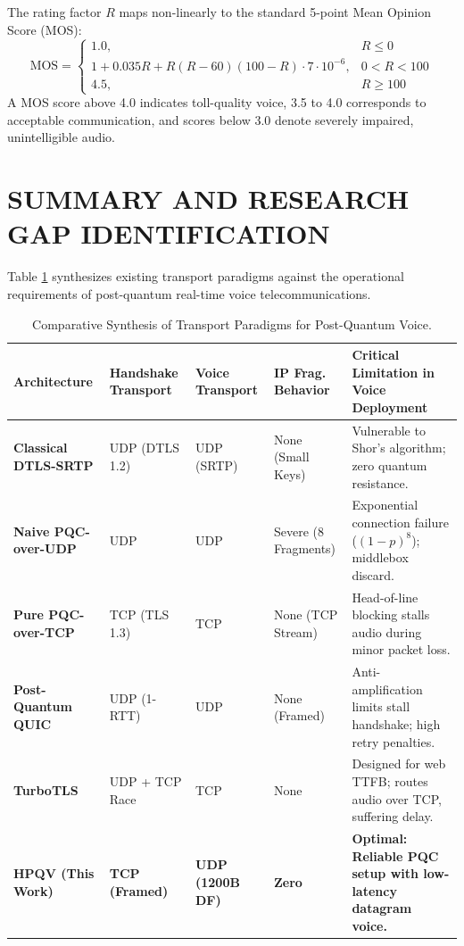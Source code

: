 The rating factor $R$ maps non-linearly to the standard 5-point Mean Opinion Score (MOS):
\begin{equation}
    \text{MOS} = 
    \begin{cases} 
      1.0, & R \le 0 \\
      1 + 0.035 R + R(R - 60)(100 - R) \cdot 7 \cdot 10^{-6}, & 0 < R < 100 \\
      4.5, & R \ge 100 
   \end{cases}
\end{equation}
A MOS score above 4.0 indicates toll-quality voice, 3.5 to 4.0 corresponds to acceptable communication, and scores below 3.0 denote severely impaired, unintelligible audio.

\section{SUMMARY AND RESEARCH GAP IDENTIFICATION}
Table \ref{tab:literature_comparison} synthesizes existing transport paradigms against the operational requirements of post-quantum real-time voice telecommunications.

\begin{table}[htbp]
    \centering
    \caption{Comparative Synthesis of Transport Paradigms for Post-Quantum Voice.}
    \label{tab:literature_comparison}
    \small
    \begin{tabularx}{\textwidth}{>{\raggedright\arraybackslash}p{2.6cm} >{\raggedright\arraybackslash}p{2.2cm} >{\raggedright\arraybackslash}p{2.2cm} >{\raggedright\arraybackslash}p{2.2cm} >{\raggedright\arraybackslash}X}
        \toprule
        \textbf{Architecture} & \textbf{Handshake Transport} & \textbf{Voice Transport} & \textbf{IP Frag. Behavior} & \textbf{Critical Limitation in Voice Deployment} \\
        \midrule
        \textbf{Classical DTLS-SRTP} & UDP (DTLS 1.2) & UDP (SRTP) & None (Small Keys) & Vulnerable to Shor's algorithm; zero quantum resistance. \\
        \addlinespace
        \textbf{Naive PQC-over-UDP} & UDP & UDP & Severe (8 Fragments) & Exponential connection failure ($(1-p)^8$); middlebox discard. \\
        \addlinespace
        \textbf{Pure PQC-over-TCP} & TCP (TLS 1.3) & TCP & None (TCP Stream) & Head-of-line blocking stalls audio during minor packet loss. \\
        \addlinespace
        \textbf{Post-Quantum QUIC} & UDP (1-RTT) & UDP & None (Framed) & Anti-amplification limits stall handshake; high retry penalties. \\
        \addlinespace
        \textbf{TurboTLS \cite{aguilar2024turbotls}} & UDP + TCP Race & TCP & None & Designed for web TTFB; routes audio over TCP, suffering delay. \\
        \addlinespace
        \textbf{HPQV (This Work)} & \textbf{TCP (Framed)} & \textbf{UDP (1200B DF)} & \textbf{Zero} & \textbf{Optimal: Reliable PQC setup with low-latency datagram voice.} \\
        \bottomrule
    \end{tabularx}
\end{table}

